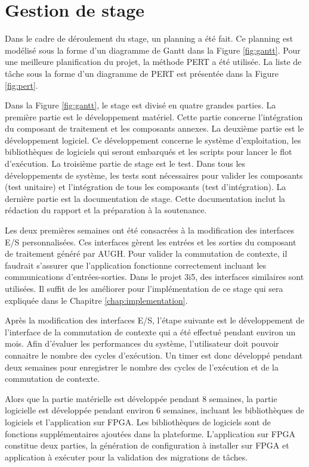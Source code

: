 \section{Gestion de stage}
\label{sec:gestion}
\justify
Dans le cadre de déroulement du stage, un planning a été fait.
Ce planning est modélisé sous la forme d'un diagramme de Gantt dans la Figure \ref{fig:gantt}. Pour une meilleure planification du projet, 
la méthode \gls{PERT} a été utilisée. La liste de tâche sous la forme d'un diagramme de PERT est présentée
dans la Figure \ref{fig:pert}.

Dans la Figure \ref{fig:gantt}, le stage est divisé en quatre grandes parties. 
La première partie est le développement matériel. Cette partie concerne 
l'intégration du composant de traitement et les composants annexes. La deuxième partie est le développement logiciel. Ce développement
concerne le système d'exploitation, les bibliothèques de logiciels qui seront embarqués et les scripts pour lancer le flot d'exécution.
La troisième partie de stage est le test. Dans tous les développements de système, les tests sont nécessaires
pour valider les composants (test unitaire) et l'intégration de tous les composants (test d'intégration). La dernière partie
est la documentation de stage. Cette documentation inclut la rédaction du rapport et la préparation à la soutenance.

Les deux premières semaines ont été consacrées à la modification des interfaces E/S personnalisées. Ces interfaces
gèrent les entrées et les sorties du composant de traitement généré par AUGH. Pour valider la commutation de contexte,
il faudrait s'assurer que l'application fonctionne correctement incluant les communications d'entrées-sorties.
Dans le projet 3i5, des interfaces similaires sont utilisées. Il suffit de les améliorer pour l'implémentation
de ce stage qui sera expliquée dans le Chapitre \ref{chap:implementation}.

Après la modification des interfaces E/S, l'étape suivante est le développement de l'interface de la commutation
de contexte qui a été effectué pendant environ un mois. Afin d'évaluer les performances du système, l'utilisateur doit pouvoir connaitre le
nombre des cycles d'exécution. Un timer est donc développé pendant deux semaines pour enregistrer
le nombre des cycles de l'exécution et de la commutation de contexte. 

Alors que la partie matérielle est développée pendant
8 semaines, la partie logicielle est développée pendant environ 6 semaines, incluant les bibliothèques de logiciels et l'application sur FPGA.
Les bibliothèques de logiciels sont de fonctions supplémentaires ajoutées dans la plateforme. L'application sur FPGA
constitue deux parties, la génération de configuration à installer sur FPGA et application à exécuter pour la validation des
migrations de tâches.

